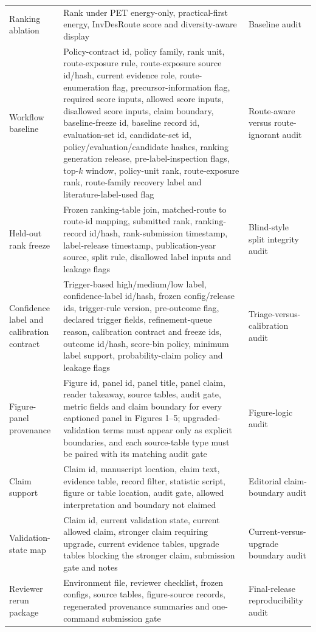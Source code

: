 \documentclass[11pt, letterpaper]{article}
\begin{document}
\begin{table}[p]
\begin{tabular}{L{0.24\textwidth}L{0.515\textwidth}L{0.145\textwidth}}
Ranking ablation & Rank under PET energy-only, practical-first energy, InvDesRoute score and diversity-aware display & Baseline audit \\
Workflow baseline & Policy-contract id, policy family, rank unit, route-exposure rule, route-exposure source id/hash, current evidence role, route-enumeration flag, precursor-information flag, required score inputs, allowed score inputs, disallowed score inputs, claim boundary, baseline-freeze id, baseline record id, evaluation-set id, candidate-set id, policy/evaluation/candidate hashes, ranking generation release, pre-label-inspection flags, top-$k$ window, policy-unit rank, route-exposure rank, route-family recovery label and literature-label-used flag & Route-aware versus route-ignorant audit \\
Held-out rank freeze & Frozen ranking-table join, matched-route to route-id mapping, submitted rank, ranking-record id/hash, rank-submission timestamp, label-release timestamp, publication-year source, split rule, disallowed label inputs and leakage flags & Blind-style split integrity audit \\
Confidence label and calibration contract & Trigger-based high/medium/low label, confidence-label id/hash, frozen config/release ids, trigger-rule version, pre-outcome flag, declared trigger fields, refinement-queue reason, calibration contract and freeze ids, outcome id/hash, score-bin policy, minimum label support, probability-claim policy and leakage flags & Triage-versus-calibration audit \\
Figure-panel provenance & Figure id, panel id, panel title, panel claim, reader takeaway, source tables, audit gate, metric fields and claim boundary for every captioned panel in Figures 1--5; upgraded-validation terms must appear only as explicit boundaries, and each source-table type must be paired with its matching audit gate & Figure-logic audit \\
Claim support & Claim id, manuscript location, claim text, evidence table, record filter, statistic script, figure or table location, audit gate, allowed interpretation and boundary not claimed & Editorial claim-boundary audit \\
Validation-state map & Claim id, current validation state, current allowed claim, stronger claim requiring upgrade, current evidence tables, upgrade tables blocking the stronger claim, submission gate and notes & Current-versus-upgrade boundary audit \\
Reviewer rerun package & Environment file, reviewer checklist, frozen configs, source tables, figure-source records, regenerated provenance summaries and one-command submission gate & Final-release reproducibility audit \\
\bottomrule
\end{tabular}
\endgroup
\label{supp-tab:reproducibility_fields}
\end{table}
\end{document}
